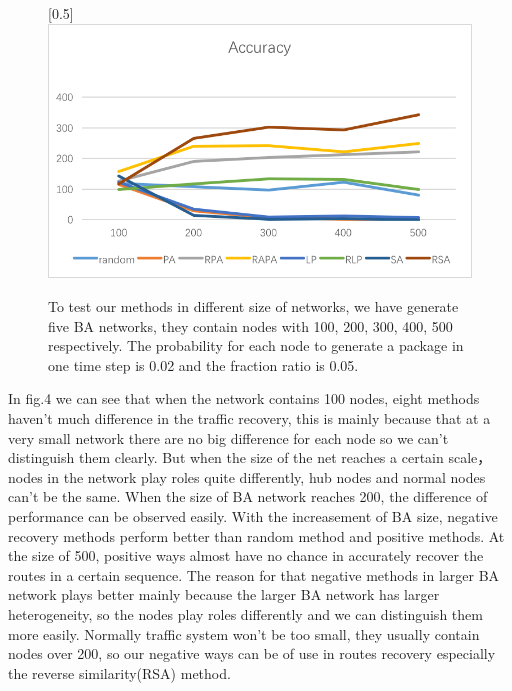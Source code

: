 \documentclass[onecolumn,preprintnumbers,amsmath,amssymb]{revtex4}
\begin{document}
\begin{figure}[ht]
\scalebox{0.5}[0.5]{\includegraphics[trim=0 10 0 0]{baSize.png}}
\caption{To test our methods in different size of networks, we have generate five BA networks, they contain nodes with 100, 200, 300, 400, 500 respectively. The probability for each node to generate a package in one time step is 0.02 and the fraction ratio is 0.05.}\label{BAZD}
\end{figure}


In fig.4 we can see that when the network contains 100 nodes, eight methods haven't much difference in the traffic recovery, this is mainly because that at a very small network there are no big difference for each node so we can't distinguish them clearly. But when the size of the net reaches a certain scale， nodes in the network play roles quite differently, hub nodes and normal nodes can't be the same. When the size of BA network reaches 200, the difference of performance can be observed easily. With the increasement of BA size, negative recovery methods perform better than random method and positive methods. At the size of 500, positive ways almost have no chance in accurately recover the routes in a certain sequence. The reason for that negative methods in larger BA network plays better mainly because the larger BA network has larger heterogeneity, so the nodes play roles differently and we can distinguish them more easily. Normally traffic system won't be too small, they usually contain nodes over 200, so our negative ways can be of use in routes recovery especially the reverse similarity(RSA) method. 
\end{document}
